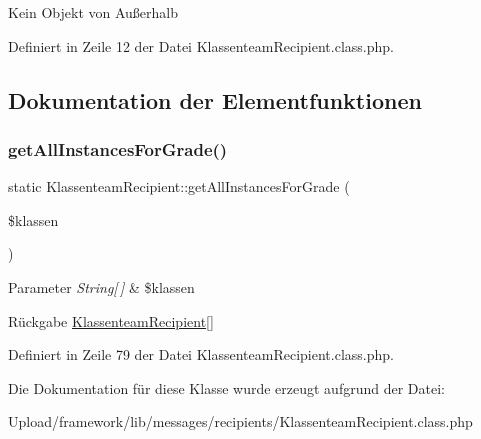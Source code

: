 Kein Objekt von Außerhalb 

Definiert in Zeile 12 der Datei Klassenteam\+Recipient.\+class.\+php.



\subsection{Dokumentation der Elementfunktionen}
\mbox{\label{class_klassenteam_recipient_a4142e5290ce7f5890fa785db11f23a03}} 
\subsubsection{\texorpdfstring{get\+All\+Instances\+For\+Grade()}{getAllInstancesForGrade()}}
{\footnotesize\ttfamily static Klassenteam\+Recipient\+::get\+All\+Instances\+For\+Grade (\begin{DoxyParamCaption}\item[{}]{\$klassen }\end{DoxyParamCaption})\hspace{0.3cm}{\ttfamily [static]}}


\begin{DoxyParams}{Parameter}
{\em String\mbox{[}$\,$\mbox{]}} & \$klassen \\
\hline
\end{DoxyParams}
\begin{DoxyReturn}{Rückgabe}
\mbox{\hyperlink{class_klassenteam_recipient}{Klassenteam\+Recipient}}\mbox{[}\mbox{]} 
\end{DoxyReturn}


Definiert in Zeile 79 der Datei Klassenteam\+Recipient.\+class.\+php.



Die Dokumentation für diese Klasse wurde erzeugt aufgrund der Datei\+:\begin{DoxyCompactItemize}
\item 
Upload/framework/lib/messages/recipients/Klassenteam\+Recipient.\+class.\+php\end{DoxyCompactItemize}

